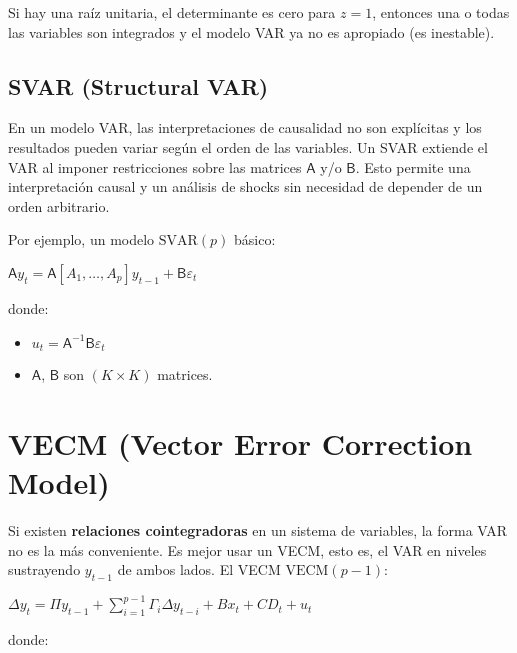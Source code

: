 \documentclass[10pt, a4paper, landscape]{article}
\begin{document}
\begin{multicols}{2}
Si hay una raíz unitaria, el determinante es cero para \( z = 1 \), entonces una o todas las variables son integrados y el modelo VAR ya no es apropiado (es inestable).

\subsection*{SVAR (Structural VAR)}

En un modelo VAR, las interpretaciones de causalidad no son explícitas y los resultados pueden variar según el orden de las variables. Un SVAR extiende el VAR al imponer restricciones sobre las matrices \( \mathsf{A} \) y/o \( \mathsf{B} \). Esto permite una interpretación causal y un análisis de shocks sin necesidad de depender de un orden arbitrario.

Por ejemplo, un modelo \( \text{SVAR}(p) \) básico:

\begin{center}
	\( \mathsf{A} y_t = \mathsf{A} [A_1, \ldots, A_p] y_{t - 1} + \mathsf{B} \varepsilon_t \)
\end{center}

donde:

\begin{itemize}[leftmargin=*]
	\item \( u_t = \mathsf{A}^{-1} \mathsf{B} \varepsilon_t \)
	\item \( \mathsf{A} \), \( \mathsf{B} \) son \( (K \times K) \) matrices.
\end{itemize}

\columnbreak

\section*{VECM (Vector Error Correction Model)}

Si existen \textbf{relaciones cointegradoras} en un sistema de variables, la forma VAR no es la más conveniente. Es mejor usar un VECM, esto es, el VAR en niveles sustrayendo \( y_{t - 1} \) de ambos lados. El VECM \( \text{VECM}(p - 1) \):

\begin{center}
	\( \Delta y_{t} = \Pi y_{t - 1} + \sum_{i = 1}^{p - 1} \Gamma_{i} \Delta y_{t - i} + B x_{t} + CD_{t} + u_{t} \)
\end{center}

donde:


\end{multicols}
\end{document}

